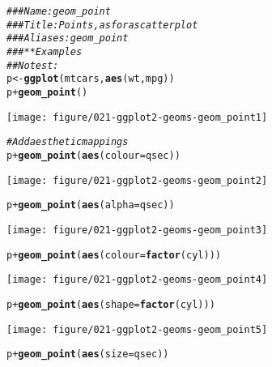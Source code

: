 \documentclass[a4paper,titlepage]{tufte-handout}\usepackage[]{graphicx}\usepackage[]{color}
\makeatletter
\def\maxwidth{ %
  \ifdim\Gin@nat@width>\linewidth
    \linewidth
  \else
    \Gin@nat@width
  \fi
}
\newcommand{\hlcom}[1]{\textcolor[rgb]{0.678,0.584,0.686}{\textit{#1}}}%
\newcommand{\hlopt}[1]{\textcolor[rgb]{0,0,0}{#1}}%
\newcommand{\hlstd}[1]{\textcolor[rgb]{0.345,0.345,0.345}{#1}}%
\newcommand{\hlkwb}[1]{\textcolor[rgb]{0.69,0.353,0.396}{#1}}%
\newcommand{\hlkwc}[1]{\textcolor[rgb]{0.333,0.667,0.333}{#1}}%
\newcommand{\hlkwd}[1]{\textcolor[rgb]{0.737,0.353,0.396}{\textbf{#1}}}%
\newenvironment{kframe}{%
 \def\at@end@of@kframe{}%
 \ifinner\ifhmode%
  \def\at@end@of@kframe{\end{minipage}}%
  \begin{minipage}{\columnwidth}%
 \fi\fi%
 \def\FrameCommand##1{\hskip\@totalleftmargin \hskip-\fboxsep
 \colorbox{shadecolor}{##1}\hskip-\fboxsep
     \hskip-\linewidth \hskip-\@totalleftmargin \hskip\columnwidth}%
 \MakeFramed {\advance\hsize-\width
   \@totalleftmargin\z@ \linewidth\hsize
   \@setminipage}}%
 {\par\unskip\endMakeFramed%
 \at@end@of@kframe}
\newenvironment{knitrout}{}{} %
\makeatother
\begin{document}
\begin{knitrout}
\color{fgcolor}\begin{kframe}
\begin{alltt}
\hlcom{### Name: geom_point}
\hlcom{### Title: Points, as for a scatterplot}
\hlcom{### Aliases: geom_point}
\hlcom{### ** Examples}
\hlcom{## No test: }
\hlstd{p} \hlkwb{<-} \hlkwd{ggplot}\hlstd{(mtcars,} \hlkwd{aes}\hlstd{(wt, mpg))}
\hlstd{p} \hlopt{+} \hlkwd{geom_point}\hlstd{()}
\end{alltt}
\end{kframe}
\texttt{[image: figure/021-ggplot2-geoms-geom\_point1]} 
\begin{kframe}\begin{alltt}
\hlcom{# Add aesthetic mappings}
\hlstd{p} \hlopt{+} \hlkwd{geom_point}\hlstd{(}\hlkwd{aes}\hlstd{(}\hlkwc{colour} \hlstd{= qsec))}
\end{alltt}
\end{kframe}
\texttt{[image: figure/021-ggplot2-geoms-geom\_point2]} 
\begin{kframe}\begin{alltt}
\hlstd{p} \hlopt{+} \hlkwd{geom_point}\hlstd{(}\hlkwd{aes}\hlstd{(}\hlkwc{alpha} \hlstd{= qsec))}
\end{alltt}
\end{kframe}
\texttt{[image: figure/021-ggplot2-geoms-geom\_point3]} 
\begin{kframe}\begin{alltt}
\hlstd{p} \hlopt{+} \hlkwd{geom_point}\hlstd{(}\hlkwd{aes}\hlstd{(}\hlkwc{colour} \hlstd{=} \hlkwd{factor}\hlstd{(cyl)))}
\end{alltt}
\end{kframe}
\texttt{[image: figure/021-ggplot2-geoms-geom\_point4]} 
\begin{kframe}\begin{alltt}
\hlstd{p} \hlopt{+} \hlkwd{geom_point}\hlstd{(}\hlkwd{aes}\hlstd{(}\hlkwc{shape} \hlstd{=} \hlkwd{factor}\hlstd{(cyl)))}
\end{alltt}
\end{kframe}
\texttt{[image: figure/021-ggplot2-geoms-geom\_point5]} 
\begin{kframe}\begin{alltt}
\hlstd{p} \hlopt{+} \hlkwd{geom_point}\hlstd{(}\hlkwd{aes}\hlstd{(}\hlkwc{size} \hlstd{= qsec))}
\end{alltt}
\end{kframe}

\end{knitrout}
\end{document}
